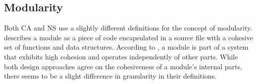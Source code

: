 \subsection{Modularity}

Both CA and NS use a slightly different definitions for the concept of modularity.
\textcite[82]{robert_c_martin_clean_2018} describes a module as a piece of code
encapsulated in a source file with a cohesive set of functions and data structures.
According to \textcite[22]{mannaert_normalized_2016}, a module is part of a system that
exhibits high cohesion and operates independently of other parts.  While both design
approaches agree on the cohesiveness of a module's internal parts, there seems to be a
slight difference in granularity in their definitions.